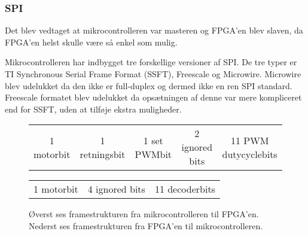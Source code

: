 \subsubsection{SPI}
\label{sec:spi-implementering}
Det blev vedtaget at mikrocontrolleren var masteren og FPGA'en blev slaven, da FPGA'en helst skulle være så enkel som mulig.

Mikrocontrolleren har indbygget tre forskellige versioner af SPI. De tre typer er TI Synchronous Serial Frame Format (SSFT), Freescale og Microwire. 
Microwire blev udelukket da den ikke er full-duplex og dermed ikke en ren SPI standard. 
Freescale formatet blev udelukket da opsætningen af denne var mere kompliceret end for SSFT, uden at tilføje ekstra muligheder.


\begin{figure}[th!]
\centering
\begin{tabular}{c|c|c|c|c}
1 motorbit &1 retningsbit & 1 set PWMbit & 2 ignored bits & 11 PWM dutycyclebits\\
\end{tabular}
 \begin{tabular}{c|c|c}
 1 motorbit & 4 ignored bits & 11 decoderbits
 \end{tabular}
\captionsetup{type=figure}
\caption[SPI framestruktur]{Øverst ses framestrukturen fra mikrocontrolleren til FPGA'en. Nederst ses framestrukturen fra FPGA'en til mikrocontrolleren.}
\label{tb:protokol1}
\end{figure}



